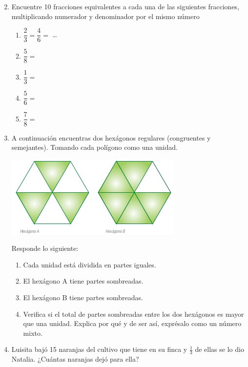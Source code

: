 \documentclass[fleqn]{article}
\begin{document}
\begin{enumerate}
\begin{enumerate}
\begin{multicols}{2}
  \end{multicols}
 \end{enumerate}
 \noanswer
  \item Encuentre 10 fracciones equivalentes a cada una de las siguientes fracciones, multiplicando numerador y denominador por el mismo número
 \begin{enumerate}
 \item $\dfrac{2}{3}=\dfrac{4}{6}=$ \dots
 \item $\dfrac{5}{8}=$
 \item $\dfrac{1}{3}=$
\newpage
 \item $\dfrac{5}{6}=$
 \item $\dfrac{7}{8}=$
 \end{enumerate}
 \item A continuación encuentras dos hexágonos regulares (congruentes y semejantes). Tomando cada polígono como una unidad.
\begin{center}
 \includegraphics[scale=.5]{Images/hexagonos.png} 
 \end{center} 
 Responde lo siguiente:
 \begin{enumerate}
 \item Cada unidad está dividida en \underline{\hspace*{20pt}} partes
iguales.
 \item El hexágono A tiene \underline{\hspace*{20pt}} partes sombreadas.
 \item El hexágono B tiene \underline{\hspace*{20pt}} partes sombreadas.
 \item Verifica si el total de partes sombreadas entre los dos hexágonos es mayor que una unidad. Explica por qué y de ser así, exprésalo como un
número mixto.\noanswer[1in]
 \end{enumerate}
 \item Luisita bajó 15 naranjas del cultivo que tiene en su finca y $\frac{1}{3}$ de ellas se lo dio Natalia. ¿Cuántas naranjas dejó para ella?\noanswer
 \end{enumerate}
\end{document}
